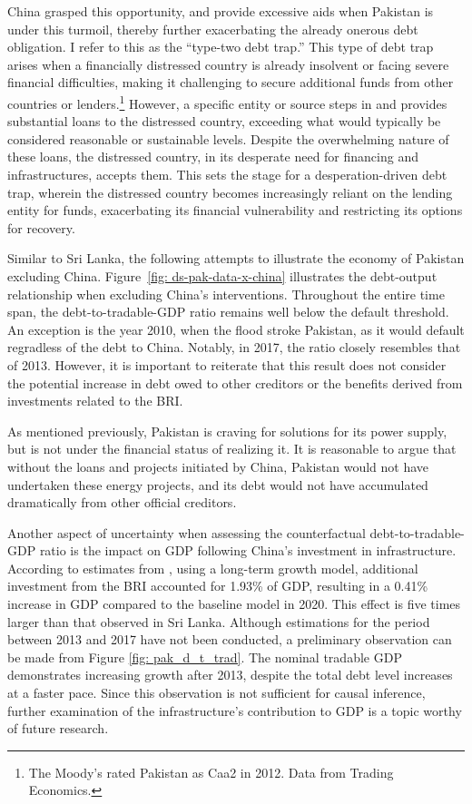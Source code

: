 China grasped this opportunity, and provide excessive aids when Pakistan is under this turmoil, thereby further exacerbating the already onerous debt obligation. I refer to this as the ``type-two debt trap.''
This type of debt trap arises when a financially distressed country is already insolvent or facing severe financial difficulties, making it challenging to secure additional funds from other countries or lenders.\footnote{
    The Moody's rated Pakistan as Caa2 in 2012. Data from Trading Economics.
}
However, a specific entity or source steps in and provides substantial loans to the distressed country, exceeding what would typically be considered reasonable or sustainable levels. Despite the overwhelming nature of these loans, the distressed country, in its desperate need for financing and infrastructures, accepts them. This sets the stage for a desperation-driven debt trap, wherein the distressed country becomes increasingly reliant on the lending entity for funds, exacerbating its financial vulnerability and restricting its options for recovery.

Similar to Sri Lanka, the following attempts to illustrate the economy of Pakistan excluding China. Figure~\ref{fig: ds-pak-data-x-china} illustrates the debt-output relationship when excluding China's interventions. Throughout the entire time span, the debt-to-tradable-GDP ratio remains well below the default threshold. An exception is the year 2010, when the flood stroke Pakistan, as it would default regradless of the debt to China. Notably, in 2017, the ratio closely resembles that of 2013. However, it is important to reiterate that this result does not consider the potential increase in debt owed to other creditors or the benefits derived from investments related to the BRI.

As mentioned previously, Pakistan is craving for solutions for its power supply, but is not under the financial status of realizing it. It is reasonable to argue that without the loans and projects initiated by China, Pakistan would not have undertaken these energy projects, and its debt would not have accumulated dramatically from other official creditors.

Another aspect of uncertainty when assessing the counterfactual debt-to-tradable-GDP ratio is the impact on GDP following China's investment in infrastructure. According to estimates from \citet*{Bandiera-Vasileios-BRI-debt}, using a long-term growth model, additional investment from the BRI accounted for 1.93\% of GDP, resulting in a 0.41\% increase in GDP compared to the baseline model in 2020. This effect is five times larger than that observed in Sri Lanka. Although estimations for the period between 2013 and 2017 have not been conducted, a preliminary observation can be made from Figure \ref{fig: pak_d_t_trad}. The nominal tradable GDP demonstrates increasing growth after 2013, despite the total debt level increases at a faster pace. Since this observation is not sufficient for causal inference, further examination of the infrastructure's contribution to GDP is a topic worthy of future research.